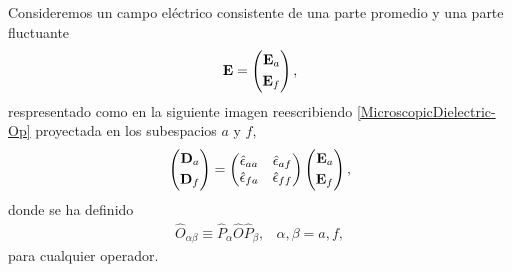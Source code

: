 \documentclass[12pt]{article}
\begin{document}
Consideremos un campo eléctrico consistente de una parte promedio y
una parte fluctuante
\begin{equation}
  {\bf E} = \left(\begin{split} {\bf E}_{a} \\
    {\bf E}_{f} \end{split}\right),
\end{equation}
respresentado como en la siguiente imagen reescribiendo
\eqref{MicroscopicDielectric-Op} proyectada en los subespacios $a$ y
$f$,
\begin{equation}
  \label{CamposCompletos}
  \left(\begin{split} {\bf D}_{a} \\  {\bf D}_{f} \end{split}\right) =
  \left(\begin{matrix} \hat{\epsilon}_{aa} & \hat{\epsilon}_{af} \\
    \hat{\epsilon}_{fa} & \hat{\epsilon}_{ff} \end{matrix}\right)
  \left(\begin{split} {\bf E}_{a} \\ {\bf E}_{f} \end{split}\right),
\end{equation}
donde se ha definido
\begin{equation}
  \begin{array}{cc}
    \hat{O}_{\alpha \beta}\equiv \hat{P}_{\alpha}\hat{O}\hat{P}_{\beta}, & \alpha,\beta =a,f,
  \end{array}
\end{equation}
para cualquier operador.
\end{document}
